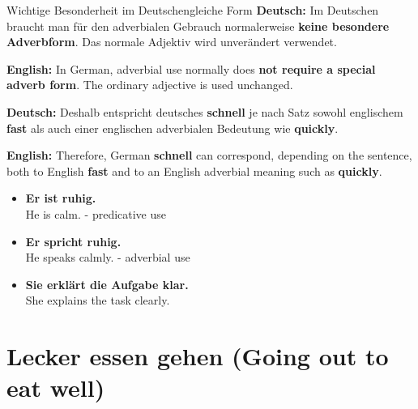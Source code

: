 \documentclass[a4paper,11pt]{article}
\newcommand{\GermanText}[1]{\textbf{Deutsch: }#1\par}
\newcommand{\EnglishText}[1]{{\small\color{SoftGray}\textbf{English: }#1\par}}
\newcommand{\ExampleItem}[2]{\item \textbf{#1}\\{\small\color{SoftGray}#2}}
\begin{document}
        \begin{grammarentry}{Wichtige Besonderheit im Deutschen}{gleiche Form}
            \GermanText{Im Deutschen braucht man für den adverbialen Gebrauch normalerweise \textbf{keine besondere Adverbform}. Das normale Adjektiv wird unverändert verwendet.}
            \EnglishText{In German, adverbial use normally does \textbf{not require a special adverb form}. The ordinary adjective is used unchanged.}

            \GermanText{Deshalb entspricht deutsches \textbf{schnell} je nach Satz sowohl englischem \textbf{fast} als auch einer englischen adverbialen Bedeutung wie \textbf{quickly}.}
            \EnglishText{Therefore, German \textbf{schnell} can correspond, depending on the sentence, both to English \textbf{fast} and to an English adverbial meaning such as \textbf{quickly}.}
        \end{grammarentry}

        \begin{exbox}
            \begin{itemize}
                \ExampleItem{Er ist ruhig.}{He is calm. - predicative use}
                \ExampleItem{Er spricht ruhig.}{He speaks calmly. - adverbial use}
                \ExampleItem{Sie erklärt die Aufgabe klar.}{She explains the task clearly.}
            \end{itemize}
        \end{exbox}

        \section{\glqq Lecker essen gehen\grqq{} \textnormal{(Going out to eat well)}}
\end{document}
